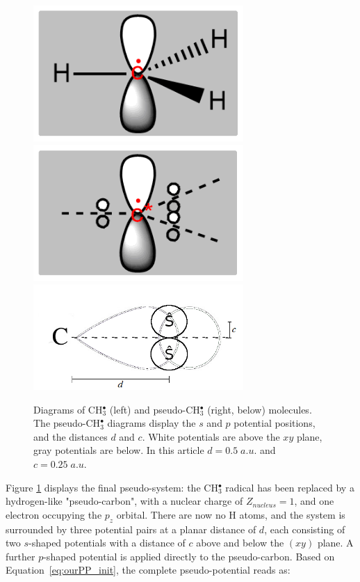 \documentclass[aip]{revtex4-1}
\begin{document}
\begin{figure}
\begin{center}
\includegraphics[width=8cm]{ch3.png}
\includegraphics[width=8cm]{pseudoch3.png}
\includegraphics[width=8cm]{tm_sp2_potentials.png}
\end{center}
\caption{Diagrams of CH\(^{\bullet}_{3}\) (left) and pseudo-CH\(^{\bullet}_{3}\)
(right, below) molecules.
The pseudo-CH\(^{\bullet}_{3}\) diagrams display the \(s\) and \(p\) potential positions,
and the distances \(d\) and \(c\). White potentials are above the $xy$ plane, 
gray potentials are below.
In this article $d=0.5\;a.u.$ and $c=0.25\;a.u.$}
\label{figure:ref_pseudo_diagram}
\end{figure}

Figure \ref{figure:ref_pseudo_diagram} displays the final pseudo-system: the CH\(^{\bullet}_{3}\) radical has been replaced by
a hydrogen-like "pseudo-carbon", with a nuclear charge of \(Z_{nucleus} = 1\), and one electron occupying the \(p_{z}\) orbital. 
There are now no H atoms, and the system is surrounded by three potential pairs at a planar distance of \(d\), each consisting of 
two \(s\)-shaped potentials with a distance of \(c\) above and below the \((xy)\) plane. 
A further \(p\)-shaped potential is applied directly to the pseudo-carbon.
Based on Equation~\ref{eq:ourPP_init}, the complete pseudo-potential reads as:
\end{document}
